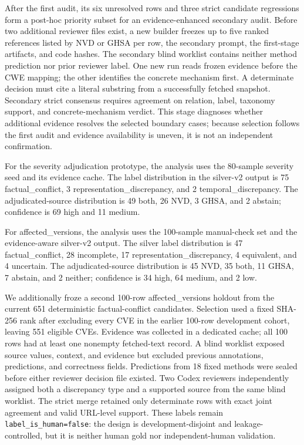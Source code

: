 After the first audit, its six unresolved rows and three strict candidate regressions form a post-hoc priority subset for an evidence-enhanced secondary audit. Before two additional reviewer files exist, a new builder freezes up to five ranked references listed by NVD or GHSA per row, the secondary prompt, the first-stage artifacts, and code hashes. The secondary blind worklist contains neither method prediction nor prior reviewer label. One new run reads frozen evidence before the CWE mapping; the other identifies the concrete mechanism first. A determinate decision must cite a literal substring from a successfully fetched snapshot. Secondary strict consensus requires agreement on relation, label, taxonomy support, and concrete-mechanism verdict. This stage diagnoses whether additional evidence resolves the selected boundary cases; because selection follows the first audit and evidence availability is uneven, it is not an independent confirmation.

For the severity adjudication prototype, the analysis uses the 80-sample severity seed and its evidence cache. The label distribution in the silver-v2 output is 75 factual\_conflict, 3 representation\_discrepancy, and 2 temporal\_discrepancy. The adjudicated-source distribution is 49 both, 26 NVD, 3 GHSA, and 2 abstain; confidence is 69 high and 11 medium.

For affected\_versions, the analysis uses the 100-sample manual-check set and the evidence-aware silver-v2 output. The silver label distribution is 47 factual\_conflict, 28 incomplete, 17 representation\_discrepancy, 4 equivalent, and 4 uncertain. The adjudicated-source distribution is 45 NVD, 35 both, 11 GHSA, 7 abstain, and 2 neither; confidence is 34 high, 64 medium, and 2 low.

We additionally froze a second 100-row affected\_versions holdout from the current 651 deterministic factual-conflict candidates. Selection used a fixed SHA-256 rank after excluding every CVE in the earlier 100-row development cohort, leaving 551 eligible CVEs. Evidence was collected in a dedicated cache; all 100 rows had at least one nonempty fetched-text record. A blind worklist exposed source values, context, and evidence but excluded previous annotations, predictions, and correctness fields. Predictions from 18 fixed methods were sealed before either reviewer decision file existed. Two Codex reviewers independently assigned both a discrepancy type and a supported source from the same blind worklist. The strict merge retained only determinate rows with exact joint agreement and valid URL-level support. These labels remain \texttt{label\_is\_human=false}: the design is development-disjoint and leakage-controlled, but it is neither human gold nor independent-human validation.

